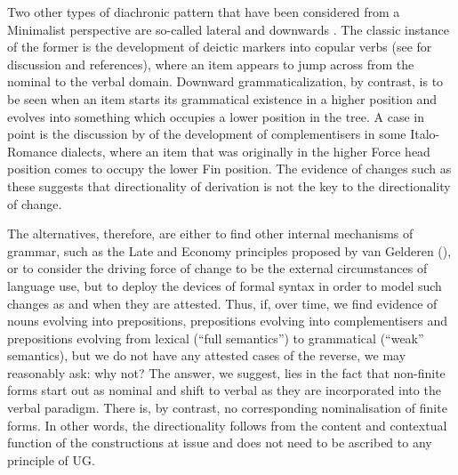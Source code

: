 \documentclass[output=paper]{langsci/langscibook}
\begin{document}
Two other types of diachronic pattern that have been considered from a
Minimalist perspective are so-called lateral  and
downwards . The classic instance of the former is the
development of deictic markers into copular verbs (see \citealt{BorjVinc17} for
discussion and references), where an item appears to jump across from the
nominal to the verbal domain. Downward grammaticalization, by contrast, is to
be seen when an item starts its grammatical existence in a higher position and
evolves into something which occupies a lower position in the tree. A case in
point is the discussion by \cite{Munaro16} of the development of
complementisers in some Italo-Romance dialects, where an
item that was originally in the higher Force head position comes to occupy the
lower Fin position. The evidence of changes such as these suggests that
directionality of derivation is not the key to the directionality of change.

The alternatives, therefore, are either to find other internal mechanisms of
grammar, such as the Late  and Economy principles proposed by van
Gelderen (\citeyear{vanGelderen2009,vanGelderen11}), or to consider the driving
force of change to be the external circumstances of language use, but to deploy
the devices of formal syntax in order to model such changes as and when they
are attested.  Thus, if, over time, we find evidence of nouns evolving into
prepositions, prepositions evolving into complementisers
and prepositions evolving from lexical (\enquote{full semantics}) to
grammatical (\enquote{weak} semantics), but we do not have any attested cases
of the reverse,  we may reasonably ask: why not? The answer, we suggest, lies
in the fact that non-finite forms start out as nominal and shift to verbal as
they are incorporated into the verbal paradigm. There is, by contrast, no
corresponding nominalisation of finite forms. In other words, the
directionality follows from the content and contextual function of the
constructions at issue and does not need to be ascribed to any principle of
\gls{UG}.
\end{document}
